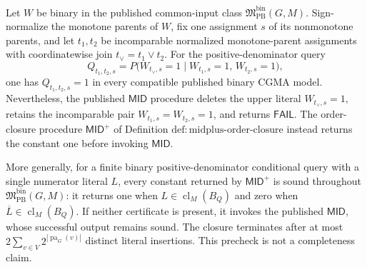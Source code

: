 Let \(W\) be binary in the published common-input class \(\mathfrak M_{\mathrm{PB}}^{\mathrm{bin}}(G,M)\).  Sign-normalize the monotone parents of \(W\), fix one assignment \(s\) of its nonmonotone parents, and let \(t_1,t_2\) be incomparable normalized monotone-parent assignments with coordinatewise join \(t_{\vee}=t_1\vee t_2\).  For the positive-denominator query
\[
 Q_{t_1,t_2,s}
 =P\bigl(W_{t_{\vee},s}=1\mid W_{t_1,s}=1,\,W_{t_2,s}=1\bigr),
\]
one has \(Q_{t_1,t_2,s}=1\) in every compatible published binary CGMA model.  Nevertheless, the published \(\mathsf{MID}\) procedure deletes the upper literal \(W_{t_{\vee},s}=1\), retains the incomparable pair \(W_{t_1,s}=W_{t_2,s}=1\), and returns \(\mathsf{FAIL}\).  The order-closure procedure \(\mathsf{MID}^{+}\) of Definition \(\mathrm{def:midplus\text{-}order\text{-}closure}\) instead returns the constant one before invoking \(\mathsf{MID}\).

More generally, for a finite binary positive-denominator conditional query with a single numerator literal \(L\), every constant returned by \(\mathsf{MID}^{+}\) is sound throughout \(\mathfrak M_{\mathrm{PB}}^{\mathrm{bin}}(G,M)\): it returns one when \(L\in\operatorname{cl}_M(B_Q)\) and zero when \(\overline L\in\operatorname{cl}_M(B_Q)\).  If neither certificate is present, it invokes the published \(\mathsf{MID}\), whose successful output remains sound.  The closure terminates after at most \(2\sum_{v\in V}2^{|\operatorname{pa}_G(v)|}\) distinct literal insertions.  This precheck is not a completeness claim.